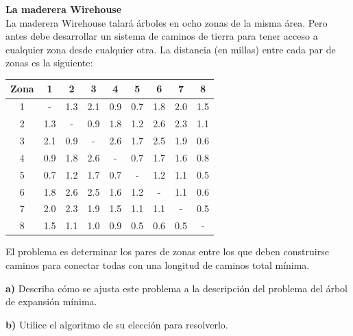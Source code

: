 \documentclass{article}
\begin{document}
\begin{problem}
\textbf{La maderera Wirehouse}\\

La maderera Wirehouse talará árboles en ocho zonas de la misma área. Pero antes debe desarrollar un sistema de caminos de tierra para tener acceso a cualquier zona desde cualquier otra. La distancia (en millas) entre cada par de zonas es la siguiente:

\begin{center}
\begin{tabular}{|c|c|c|c|c|c|c|c|c|}
\hline
Zona & 1 & 2 & 3 & 4 & 5 & 6 & 7 & 8 \\
\hline
1 & - & 1.3 & 2.1 & 0.9 & 0.7 & 1.8 & 2.0 & 1.5 \\
2 & 1.3 & - & 0.9 & 1.8 & 1.2 & 2.6 & 2.3 & 1.1 \\
3 & 2.1 & 0.9 & - & 2.6 & 1.7 & 2.5 & 1.9 & 0.6 \\
4 & 0.9 & 1.8 & 2.6 & - & 0.7 & 1.7 & 1.6 & 0.8 \\
5 & 0.7 & 1.2 & 1.7 & 0.7 & - & 1.2 & 1.1 & 0.5 \\
6 & 1.8 & 2.6 & 2.5 & 1.6 & 1.2 & - & 1.1 & 0.6 \\
7 & 2.0 & 2.3 & 1.9 & 1.5 & 1.1 & 1.1 & - & 0.5 \\
8 & 1.5 & 1.1 & 1.0 & 0.9 & 0.5 & 0.6 & 0.5 & - \\
\hline
\end{tabular}
\end{center}

El problema es determinar los pares de zonas entre los que deben construirse caminos para conectar todas con una longitud de caminos total mínima.

\textbf{a)} Describa cómo se ajusta este problema a la descripción del problema del árbol de expansión mínima.

\textbf{b)} Utilice el algoritmo de su elección para resolverlo.

\end{problem}
\end{document}
